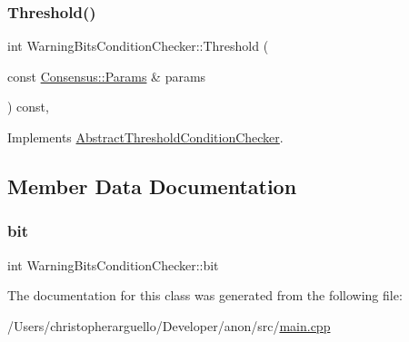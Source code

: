 \subsubsection{\texorpdfstring{Threshold()}{Threshold()}}
{\footnotesize\ttfamily int Warning\+Bits\+Condition\+Checker\+::\+Threshold (\begin{DoxyParamCaption}\item[{const \mbox{\hyperlink{chainparams_8h_a5e1ca1b35c3dd1a4e20f18445f28dd9c}{Consensus\+::\+Params}} \&}]{params }\end{DoxyParamCaption}) const\hspace{0.3cm}{\ttfamily [inline]}, {\ttfamily [virtual]}}



Implements \mbox{\hyperlink{class_abstract_threshold_condition_checker_ad01c87d6d551e9d801661d734a270a6c}{Abstract\+Threshold\+Condition\+Checker}}.



\subsection{Member Data Documentation}
\mbox{\label{class_warning_bits_condition_checker_aa5aa794fd8c944ed9926ba2c818976b8}} 
\subsubsection{\texorpdfstring{bit}{bit}}
{\footnotesize\ttfamily int Warning\+Bits\+Condition\+Checker\+::bit\hspace{0.3cm}{\ttfamily [private]}}



The documentation for this class was generated from the following file\+:\begin{DoxyCompactItemize}
\item 
/\+Users/christopherarguello/\+Developer/anon/src/\mbox{\hyperlink{main_8cpp}{main.\+cpp}}\end{DoxyCompactItemize}
